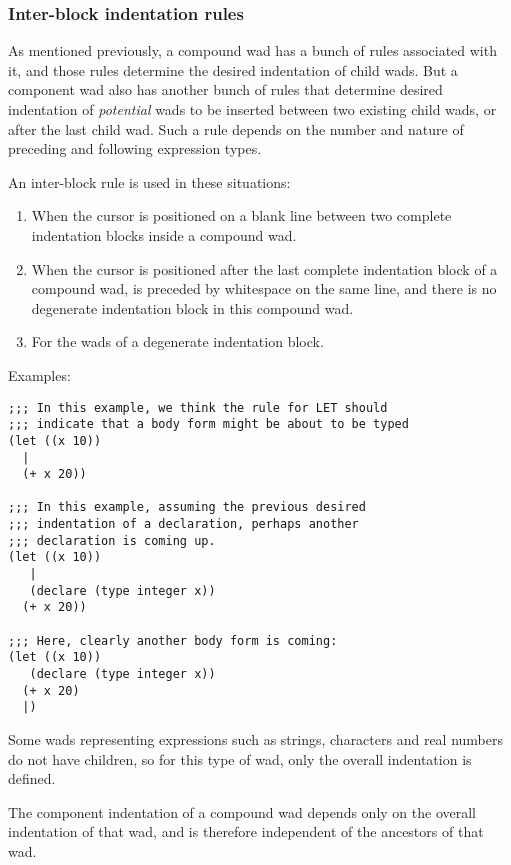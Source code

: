 \subsubsection{Inter-block indentation rules}

As mentioned previously, a compound wad has a bunch of rules
associated with it, and those rules determine the desired indentation
of child wads.  But a component wad also has another bunch of rules
that determine desired indentation of \emph{potential} wads to be
inserted between two existing child wads, or after the last child
wad.  Such a rule depends on the number and nature of preceding and
following expression types.

An inter-block rule is used in these situations:

\begin{enumerate}
\item When the cursor is positioned on a blank line between two
  complete indentation blocks inside a compound wad.
\item When the cursor is positioned after the last complete
  indentation block of a compound wad, is preceded by whitespace on
  the same line, and there is no degenerate indentation block in this
  compound wad.
\item For the wads of a degenerate indentation block.
\end{enumerate}

Examples:

\begin{verbatim}
;;; In this example, we think the rule for LET should
;;; indicate that a body form might be about to be typed
(let ((x 10))
  |
  (+ x 20))

;;; In this example, assuming the previous desired
;;; indentation of a declaration, perhaps another  
;;; declaration is coming up.
(let ((x 10))
   |
   (declare (type integer x))
  (+ x 20))

;;; Here, clearly another body form is coming:  
(let ((x 10))
   (declare (type integer x))
  (+ x 20)
  |)
\end{verbatim}

Some wads representing expressions such as strings, characters and
real numbers do not have children, so for this type of wad, only the
overall indentation is defined.

The component indentation of a compound wad depends only on the
overall indentation of that wad, and is therefore independent of the
ancestors of that wad.

